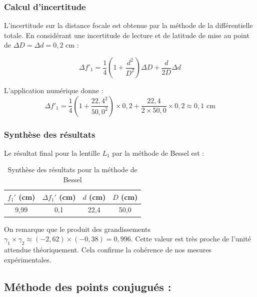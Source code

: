 \subsubsection{Calcul d'incertitude}

L'incertitude sur la distance focale est obtenue par la méthode de la différentielle totale.
En considérant une incertitude de lecture et de latitude de mise au point de $\Delta D = \Delta d = 0,2 \text{ cm}$ :

\begin{equation}
    \Delta f'_1 = \frac{1}{4} \left( 1 + \frac{d^2}{D^2} \right) \Delta D + \frac{d}{2D} \Delta d
\end{equation}

L'application numérique donne :
\begin{equation}
    \Delta f'_1 = \frac{1}{4} \left( 1 + \frac{22,4^2}{50,0^2} \right) \times 0,2 + \frac{22,4}{2 \times 50,0} \times 0,2 \approx 0,1 \text{ cm}
\end{equation}

\subsubsection{Synthèse des résultats}

Le résultat final pour la lentille $L_1$ par la méthode de Bessel est :
\begin{table}[h!]
\centering
\begin{tabular}{|c|c|c|c|}
\hline
$f_{1}'$ (cm) & $\Delta f_{1}'$ (cm) & $d$ (cm) & $D$ (cm) \\ \hline
9,99 & 0,1 & 22,4 & 50,0 \\ \hline
\end{tabular}
\caption{Synthèse des résultats pour la méthode de Bessel}
\end{table}

On remarque que le produit des grandissements $\gamma_1 \times \gamma_2 \approx (-2,62) \times (-0,38) = 0,996$.
Cette valeur est très proche de l'unité attendue théoriquement.
Cela confirme la cohérence de nos mesures expérimentales.

\subsection{Méthode des points conjugués : }

